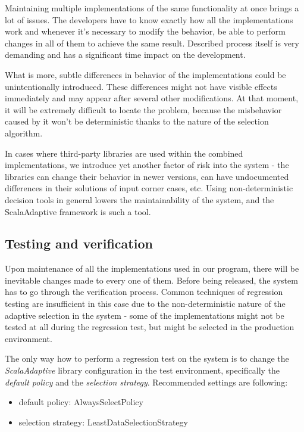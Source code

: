 Maintaining multiple implementations of the same functionality at once brings a lot of issues. The developers have to know exactly how all the implementations work and whenever it's necessary to modify the behavior, be able to perform changes in all of them to achieve the same result. Described process itself is very demanding and has a significant time impact on the development. 

What is more, subtle differences in behavior of the implementations could be unintentionally introduced. These differences might not have visible effects immediately and may appear after several other modifications. At that moment, it will be extremely difficult to locate the problem, because the misbehavior caused by it won't be deterministic thanks to the nature of the selection algorithm.

In cases where third-party libraries are used within the combined implementations, we introduce yet another factor of risk into the system - the libraries can change their behavior in newer versions, can have undocumented differences in their solutions of input corner cases, etc. Using non-deterministic decision tools in general lowers the maintainability of the system, and the ScalaAdaptive framework is such a tool.


\subsection{Testing and verification}

Upon maintenance of all the implementations used in our program, there will be inevitable changes made to every one of them. Before being released, the system has to go through the verification process. Common techniques of regression testing are insufficient in this case due to the non-deterministic nature of the adaptive selection in the system - some of the implementations might not be tested at all during the regression test, but might be selected in the production environment.

The only way how to perform a regression test on the system is to change the \textit{ScalaAdaptive} library configuration in the test environment, specifically the \textit{default policy} and the \textit{selection strategy}. Recommended settings are following:

 \begin{itemize}
 	\item default policy: AlwaysSelectPolicy
 	\item selection strategy: LeastDataSelectionStrategy
 \end{itemize}

